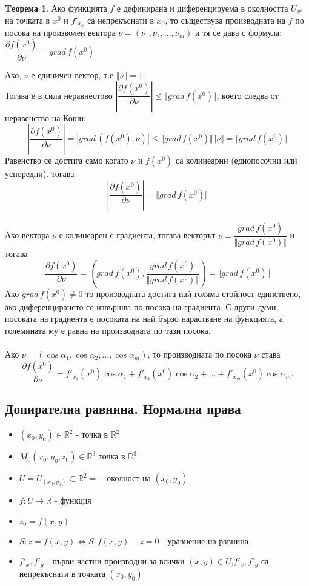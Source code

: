 \documentclass[a4paper,fleqn,12pt]{article}
\theoremstyle{definition}
\newtheorem{theorem}{Tеорема}[subsection]
\begin{document}
\begin {theorem}
Ако функцията $f$ е дефинирана и диференцируема в околността $U_{x^0}$ на точката в $x^0$ и $f'_{x_k}$ са непрекъснати в $x_0$, то съществува производната на $f$ по посока на  произволен вектора $\nu = (\nu_1, \nu_2, ..., \nu_m)$ и тя се дава с формула: $\dfrac{\partial f(x^0)}{\partial \nu} = grad \, f(x^0)$
\end {theorem}
Ако, $\nu$ е единичен вектор, т.е $\Vert \nu \Vert = 1$. \\
Тогава е в сила неравнестово $\left \vert  \dfrac{\partial f(x^0)}{\partial \nu}\right\vert  \leq \Vert grad \, f(x^0)  \Vert$, което следва от неравенство на Коши. 
$$\left \vert  \dfrac{\partial f(x^0)}{\partial \nu}\right\vert  = \left\vert  grad \, (f(x^0), \nu) \right\vert  \leq \Vert grad \, f(x^0) \Vert \Vert \nu \Vert = \Vert grad \, f(x^0)  \Vert$$
Равенство се достига само когато $\nu$ и $f(x^0)$ са колинеарни (еднопосочни или успоредни). тогава
$$\left \vert  \dfrac{\partial f(x^0)}{\partial \nu}\right\vert  = \Vert grad \, f(x^0)  \Vert$$
\\
Ако вектора $\nu$ е колинеарен с градиента, тогава векторът $\nu =  \dfrac{grad \, f(x^0)}{\Vert grad \, f(x^0) \Vert}$ и тогава 
$$
\dfrac{\partial f(x^0)}{\partial \nu} = \left( grad \, f(x^0),  \dfrac{grad \, f(x^0)}{\Vert grad \, f(x^0) \Vert} \right) = \Vert grad \, f(x^0) \Vert
$$
Ако $grad \, f(x^0) \neq 0$ то производната достига най голяма стойност единствено, ако диференцирането се извършва по посока на градиента. С други думи, посоката на градиента е посоката на най бързо нарастване на функцията, а големината му е равна на производната по тази посока. \\
\\
Ако $\nu = (\cos \alpha_1, \cos \alpha_2, ..., \cos \alpha_m)$, то производната по посока $\nu$ става 
$$\dfrac{\partial f(x^0)}{\partial \nu} = f'_{x_1}(x^0)\cos{\alpha_1} + f'_{x_2}(x^0)\cos{\alpha_2} + ... + f'_{x_m}(x^0)\cos{\alpha_m}.$$

\subsection{Допирателна равнина. Нормална права}

\begin{itemize}
\item $(x_0, y_0) \in \mathbb{R}^2$ - точка в $\mathbb{R}^2$
\item $M_0 (x_0, y_0, z_0) \in \mathbb{R}^3$  точка в $\mathbb{R}^3$
\item $U = U_{(x_0,y_0)} \subset \mathbb{R}^2 =$ - околност на $(x_0,y_0)$ 
\item $f: U \to \mathbb{R}$ - функция 
\item $z_0 = f(x,y)$ 
\item $S: z = f(x,y) \iff  S: f(x,y) - z = 0$ - уравнение на равнина 
\item $f'_x, f'_y$ - първи частни производни за всички $(x, y) \in U$,$ f'_x, f'_y$ са непрекъснати в точката $(x_0, y_0)$
\end{itemize}
\end{document}
